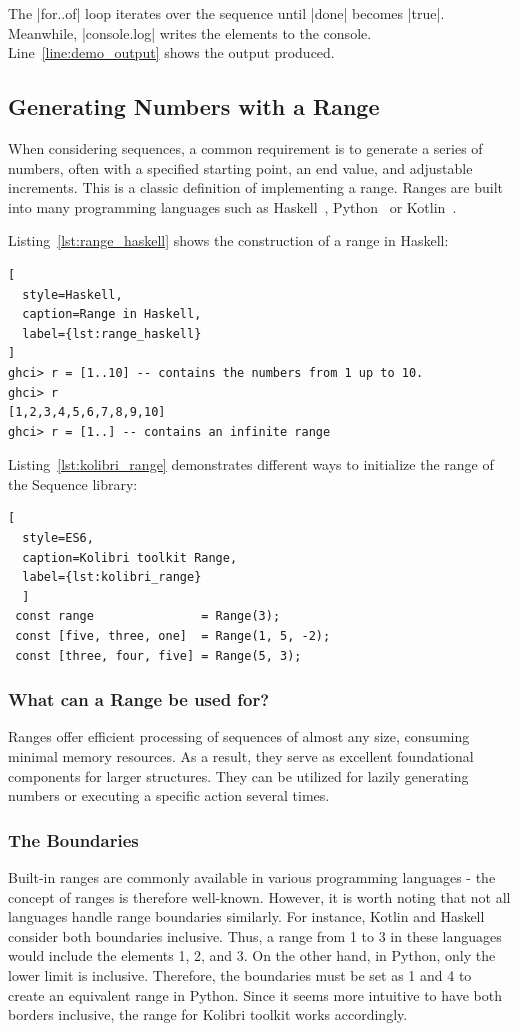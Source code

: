 The |for..of| loop iterates over the sequence until |done| becomes |true|.
Meanwhile, |console.log| writes the elements to the console.
Line~\ref{line:demo_output} shows the output produced.


\subsection{Generating Numbers with a Range}
\label{sub:Range - A Real-World Example}
When considering sequences, a common requirement is to generate a series of
numbers, often with a specified starting point, an end value, and adjustable
increments. This is a classic definition of implementing a range.
Ranges are built into many programming languages such as
Haskell~\cite{haskell_list}, Python~\cite{python_range} or
Kotlin~\cite{kotlin_ranges}.

Listing~\ref{lst:range_haskell} shows the construction of a range in Haskell:
\begin{lstlisting}[
  style=Haskell,
  caption=Range in Haskell,
  label={lst:range_haskell}
]
ghci> r = [1..10] -- contains the numbers from 1 up to 10.
ghci> r
[1,2,3,4,5,6,7,8,9,10]
ghci> r = [1..] -- contains an infinite range
\end{lstlisting}

Listing~\ref{lst:kolibri_range} demonstrates different ways to initialize the
range of the Sequence library:

\begin{lstlisting}[
  style=ES6, 
  caption=Kolibri toolkit Range,
  label={lst:kolibri_range}
  ]
 const range               = Range(3);
 const [five, three, one]  = Range(1, 5, -2);
 const [three, four, five] = Range(5, 3);
\end{lstlisting}

\subsubsection{What can a Range be used for?}
\label{subsub:What can a Range be used for?}
Ranges offer efficient processing of sequences of almost any size, consuming
minimal memory resources. As a result, they serve as excellent foundational
components for larger structures. They can be utilized for lazily generating
numbers or executing a specific action several times.

\subsubsection{The Boundaries}
\label{subsub:The Boundaries}
Built-in ranges are commonly available in various programming languages - the
concept of ranges is therefore well-known. However, it is worth noting that not
all languages handle range boundaries similarly. For instance, Kotlin and
Haskell consider both boundaries inclusive. Thus, a range from 1 to 3 in these
languages would include the elements 1, 2, and 3. On the other hand, in Python,
only the lower limit is inclusive. Therefore, the boundaries must be set as 1
and 4 to create an equivalent range in Python. Since it seems more intuitive to
have both borders inclusive, the range for Kolibri toolkit works accordingly.

